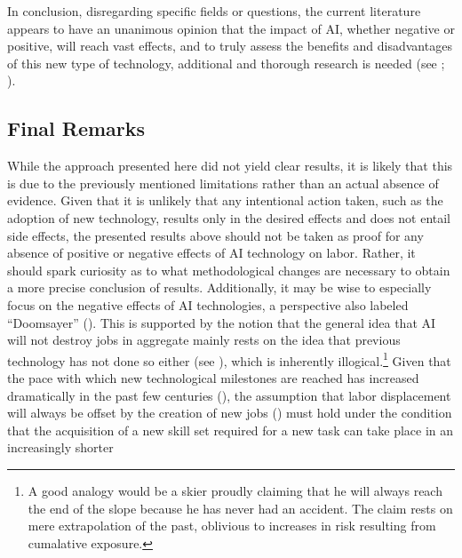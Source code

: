 \documentclass[
  12pt,
  a4paperpaper,
]{article}
\begin{document}
In conclusion, disregarding specific fields or questions, the current
literature appears to have an unanimous opinion that the impact of AI,
whether negative or positive, will reach vast effects, and to truly
assess the benefits and disadvantages of this new type of technology,
additional and thorough research is needed (see
; ).

\subsection{Final Remarks}\label{final-remarks}

While the approach presented here did not yield clear results, it is
likely that this is due to the previously mentioned limitations rather
than an actual absence of evidence. Given that it is unlikely that any
intentional action taken, such as the adoption of new technology,
results only in the desired effects and does not entail side effects,
the presented results above should not be taken as proof for any absence
of positive or negative effects of AI technology on labor. Rather, it
should spark curiosity as to what methodological changes are necessary
to obtain a more precise conclusion of results. Additionally, it may be
wise to especially focus on the negative effects of AI technologies, a
perspective also labeled ``Doomsayer''
(). This is
supported by the notion that the general idea that AI will not destroy
jobs in aggregate mainly rests on the idea that previous technology has
not done so either (see
), which is inherently illogical.\footnote{A good
  analogy would be a skier proudly claiming that he will always reach
  the end of the slope because he has never had an accident. The claim
  rests on mere extrapolation of the past, oblivious to increases in
  risk resulting from cumalative exposure.} Given that the pace with
which new technological milestones are reached has increased
dramatically in the past few centuries
(), the assumption
that labor displacement will always be offset by the creation of new
jobs () must hold under the condition that the acquisition of a new skill
set required for a new task can take place in an increasingly shorter
\end{document}
